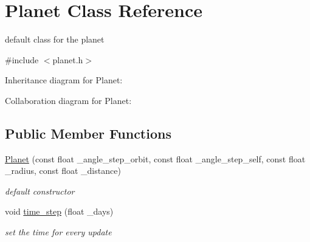 \hypertarget{classPlanet}{}\section{Planet Class Reference}
\label{classPlanet}


default class for the planet  




{\ttfamily \#include $<$planet.\+h$>$}



Inheritance diagram for Planet\+:


Collaboration diagram for Planet\+:
\subsection*{Public Member Functions}
\begin{DoxyCompactItemize}
\item 
\hyperlink{classPlanet_a342b2e89969c70f5701c8f9d4726cfc2}{Planet} (const float \+\_\+angle\+\_\+step\+\_\+orbit, const float \+\_\+angle\+\_\+step\+\_\+self, const float \+\_\+radius, const float \+\_\+distance)
\begin{DoxyCompactList}\small\item\em default constructor \end{DoxyCompactList}\item 
void \hyperlink{classPlanet_a9585c31501222dc0b1d4b9ee16f6f754}{time\+\_\+step} (float \+\_\+days)
\begin{DoxyCompactList}\small\item\em set the time for every update \end{DoxyCompactList}\end{DoxyCompactItemize}
